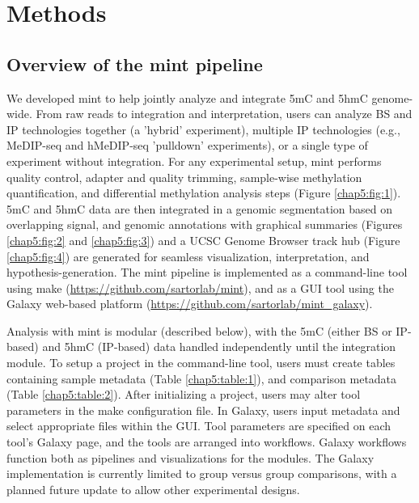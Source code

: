 \section{Methods}
\label{mint_methods}

\subsection{Overview of the mint pipeline}
\label{mint_methods_overview}

We developed mint to help jointly analyze and integrate 5mC and 5hmC genome-wide. From raw reads to integration and interpretation, users can analyze BS and IP technologies together (a 'hybrid' experiment), multiple IP technologies (e.g., MeDIP-seq and hMeDIP-seq 'pulldown' experiments), or a single type of experiment without integration.
For any experimental setup, mint performs quality control, adapter and quality trimming, sample-wise methylation quantification, and differential methylation analysis steps (Figure \ref{chap5:fig:1}). 5mC and 5hmC data are then integrated in a genomic segmentation based on overlapping signal, and genomic annotations with graphical summaries (Figures \ref{chap5:fig:2} and \ref{chap5:fig:3}) and a UCSC Genome Browser track hub (Figure \ref{chap5:fig:4}) are generated for seamless visualization, interpretation, and hypothesis-generation. The mint pipeline is implemented as a command-line tool using make (\url{https://github.com/sartorlab/mint}), and as a GUI tool using the Galaxy web-based platform \cite{Afgan:2016il} (\url{https://github.com/sartorlab/mint_galaxy}).

Analysis with mint is modular (described below), with the 5mC (either BS or IP-based) and 5hmC (IP-based) data handled independently until the integration module. To setup a project in the command-line tool, users must create tables containing sample metadata (Table \ref{chap5:table:1}), and comparison metadata (Table \ref{chap5:table:2}). After initializing a project, users may alter tool parameters in the make configuration file. In Galaxy, users input metadata and select appropriate files within the GUI. Tool parameters are specified on each tool's Galaxy page, and the tools are arranged into workflows. Galaxy workflows function both as pipelines and visualizations for the modules. The Galaxy implementation is currently limited to group versus group comparisons, with a planned future update to allow other experimental designs.

